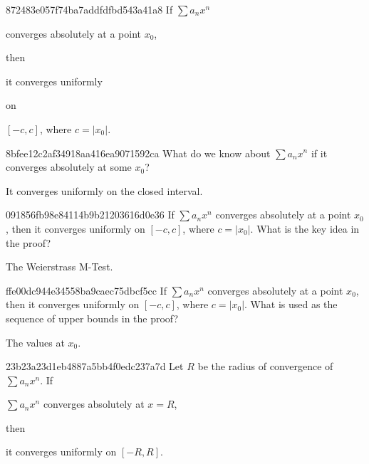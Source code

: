 \begin{note}{872483e057f74ba7addfdfbd543a41a8}
    If \({ \sum a_n x^{n} }\) \begin{icloze}{2}converges absolutely at a point \({ x_0 }\),\end{icloze} then \begin{icloze}{1}it converges uniformly\end{icloze} on \begin{icloze}{3}\({ [-c, c] }\), where \({ c = \left\lvert x_0 \right\rvert }\).\end{icloze}
\end{note}

\begin{note}{8bfee12c2af34918aa416ea9071592ca}
    What do we know about \({ \sum a_n x^{n} }\) if it converges absolutely at some \({ x_0 }\)?

    \begin{cloze}{1}
        It converges uniformly on the closed interval.
    \end{cloze}
\end{note}

\begin{note}{091856fb98e84114b9b21203616d0e36}
    If \({ \sum a_n x^{n} }\) converges absolutely at a point \({ x_0 }\), then it converges uniformly on \({ [-c, c] }\), where \({ c = \left\lvert x_0 \right\rvert }\).
    What is the key idea in the proof?

    \begin{cloze}{1}
        The Weierstrass M-Test.
    \end{cloze}
\end{note}

\begin{note}{ffe00dc944e34558ba9caec75dbcf5cc}
    If \({ \sum a_n x^{n} }\) converges absolutely at a point \({ x_0 }\), then it converges uniformly on \({ [-c, c] }\), where \({ c = \left\lvert x_0 \right\rvert }\).
    What is used as the sequence of upper bounds in the proof?

    \begin{cloze}{1}
        The values at \({ x_0 }\).
    \end{cloze}
\end{note}

\begin{note}{23b23a23d1eb4887a5bb4f0edc237a7d}
    Let \({ R }\) be the radius of convergence of \({ \sum a_n x^{n} }\).
    If \begin{icloze}{2}\({ \sum a_n x^{n} }\) converges absolutely at \({ x = R }\),\end{icloze} then \begin{icloze}{1}it converges uniformly on \({ [-R, R] }\).\end{icloze}
\end{note}

